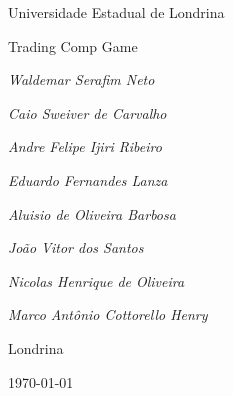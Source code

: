 \begin{titlepage}
  \centering
  \vspace*{2cm}
  {\Large Universidade Estadual de Londrina \par}
  \vspace{3cm}
  {\Huge Trading Comp Game \par}
  \vspace{2cm}
  {\Large\itshape Waldemar Serafim Neto \par}
  {\Large\itshape Caio Sweiver de Carvalho \par}
  {\Large\itshape Andre Felipe Ijiri Ribeiro \par}
  {\Large\itshape Eduardo Fernandes Lanza \par}
  {\Large\itshape Aluisio de Oliveira Barbosa \par}
  {\Large\itshape João Vitor dos Santos \par}
  {\Large\itshape Nicolas Henrique de Oliveira \par}
  {\Large\itshape Marco Antônio Cottorello Henry \par}
  \vfill
  {\large Londrina \par}
  {\Large \today \par}
\end{titlepage}
